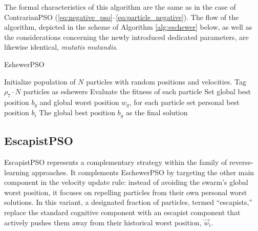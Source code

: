 {The formal characteristics of this algorithm are the same as in the case of ContrarianPSO (\ref{eq:negative_pso}--\ref{eq:particle_negative}). The flow of the algorithm, depicted in the scheme of Algorithm \ref{alg:eschewer} below, as well as the considerations concerning the newly introduced dedicated parameters, are likewise identical, \textit{mutatis mutandis}.

\vspace{.535em}
\begin{algorithm}[H]
\caption{EshewerPSO}\label{alg:eschewer}
Initialize population of \(N\) particles with random positions and velocities. Tag \(\rho_7 \cdot N\) particles as eshewers\;
Evaluate the fitness of each particle\;
Set global best position \(b_g\) and global worst position \(w_g\), for each particle set personal best position \(b_i\)\;
\Return The global best position \(b_g\) as the final solution\;
\end{algorithm}









\enlargethispage{.1\baselineskip}
\subsection*{EscapistPSO}

EscapistPSO represents a complementary strategy within the family of reverse-learning approaches. It complements EschewerPSO by targeting the other main component in the velocity update rule: instead of avoiding the swarm’s global worst position, it focuses on repelling particles from their own personal worst solutions. In this variant, a designated fraction of particles, termed ``escapists,'' replace the standard cognitive component with an escapist component that actively pushes them away from their historical worst position, $\vec{w}_i$.

}

